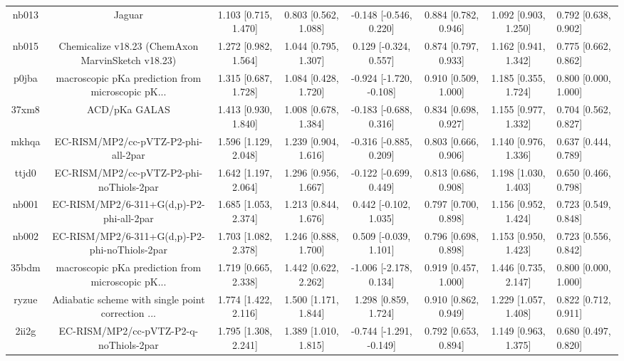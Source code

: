 \documentclass{article}
\begin{document}
\begin{center}
\begin{longtable}{|ccccccc|}
 nb013 &                                             Jaguar &  1.103 [0.715, 1.470] &  0.803 [0.562, 1.088] &   -0.148 [-0.546, 0.220] &  0.884 [0.782, 0.946] &   1.092 [0.903, 1.250] &   0.792 [0.638, 0.902] \\
 nb015 &  Chemicalize v18.23 (ChemAxon MarvinSketch v18.23) &  1.272 [0.982, 1.564] &  1.044 [0.795, 1.307] &    0.129 [-0.324, 0.557] &  0.874 [0.797, 0.933] &   1.162 [0.941, 1.342] &   0.775 [0.662, 0.862] \\
 p0jba &  macroscopic pKa prediction from microscopic pK... &  1.315 [0.687, 1.728] &  1.084 [0.428, 1.720] &  -0.924 [-1.720, -0.108] &  0.910 [0.509, 1.000] &   1.185 [0.355, 1.724] &   0.800 [0.000, 1.000] \\
 37xm8 &                                      ACD/pKa GALAS &  1.413 [0.930, 1.840] &  1.008 [0.678, 1.384] &   -0.183 [-0.688, 0.316] &  0.834 [0.698, 0.927] &   1.155 [0.977, 1.332] &   0.704 [0.562, 0.827] \\
 mkhqa &                EC-RISM/MP2/cc-pVTZ-P2-phi-all-2par &  1.596 [1.129, 2.048] &  1.239 [0.904, 1.616] &   -0.316 [-0.885, 0.209] &  0.803 [0.666, 0.906] &   1.140 [0.976, 1.336] &   0.637 [0.444, 0.789] \\
 ttjd0 &           EC-RISM/MP2/cc-pVTZ-P2-phi-noThiols-2par &  1.642 [1.197, 2.064] &  1.296 [0.956, 1.667] &   -0.122 [-0.699, 0.449] &  0.813 [0.686, 0.908] &   1.198 [1.030, 1.403] &   0.650 [0.466, 0.798] \\
 nb001 &           EC-RISM/MP2/6-311+G(d,p)-P2-phi-all-2par &  1.685 [1.053, 2.374] &  1.213 [0.844, 1.676] &    0.442 [-0.102, 1.035] &  0.797 [0.700, 0.898] &   1.156 [0.952, 1.424] &   0.723 [0.549, 0.848] \\
 nb002 &      EC-RISM/MP2/6-311+G(d,p)-P2-phi-noThiols-2par &  1.703 [1.082, 2.378] &  1.246 [0.888, 1.700] &    0.509 [-0.039, 1.101] &  0.796 [0.698, 0.898] &   1.153 [0.950, 1.423] &   0.723 [0.556, 0.842] \\
 35bdm &  macroscopic pKa prediction from microscopic pK... &  1.719 [0.665, 2.338] &  1.442 [0.622, 2.262] &   -1.006 [-2.178, 0.134] &  0.919 [0.457, 1.000] &   1.446 [0.735, 2.147] &   0.800 [0.000, 1.000] \\
 ryzue &  Adiabatic scheme with single point correction ... &  1.774 [1.422, 2.116] &  1.500 [1.171, 1.844] &     1.298 [0.859, 1.724] &  0.910 [0.862, 0.949] &   1.229 [1.057, 1.408] &   0.822 [0.712, 0.911] \\
 2ii2g &             EC-RISM/MP2/cc-pVTZ-P2-q-noThiols-2par &  1.795 [1.308, 2.241] &  1.389 [1.010, 1.815] &  -0.744 [-1.291, -0.149] &  0.792 [0.653, 0.894] &   1.149 [0.963, 1.375] &   0.680 [0.497, 0.820] \\

\end{longtable}
\end{center}
\end{document}
